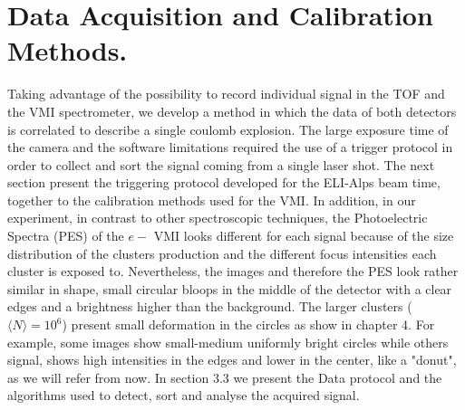 \chapter{ Data Acquisition and Calibration Methods.}

Taking advantage of the possibility to record individual signal in the TOF and the VMI spectrometer, we develop a method in which the data of both detectors is correlated to describe a single coulomb explosion. The large exposure time of the camera and the software limitations required the use of a trigger protocol in order to collect and sort the signal coming from a single laser shot. The next section present the triggering protocol developed for the ELI-Alps beam time, together to the calibration methods used for the VMI. In addition, in our experiment, in contrast to other spectroscopic techniques, the Photoelectric Spectra (PES) of the $e-$ VMI looks different for each signal because of the size distribution of the clusters production and the different focus intensities each cluster is exposed to. Nevertheless, the images and therefore the PES look rather similar in shape, small circular bloops in the middle of the detector with a clear edges and a brightness higher than the background. The larger clusters ($\langle N \rangle = 10^{6}$) present small deformation in the circles as show in chapter 4. For example, some images show small-medium  uniformly bright circles  while others signal, shows high intensities in the edges and lower in the center, like a "donut", as we will refer from now. In section 3.3 we present the Data  protocol and the algorithms used to detect, sort and analyse the acquired signal.


